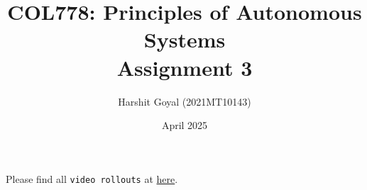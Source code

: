\documentclass{article}
\title{COL778: Principles of Autonomous Systems\\Assignment 3}
\author{Harshit Goyal (2021MT10143)}
\date{April 2025}
\begin{document}
\maketitle
Please find all \texttt{video rollouts} at \href{https://drive.google.com/drive/folders/1o8xRr7nD8Q9zVLbHLvcSWZeTbQEBov-x?usp=sharing}{here}.\\



\end{document}
